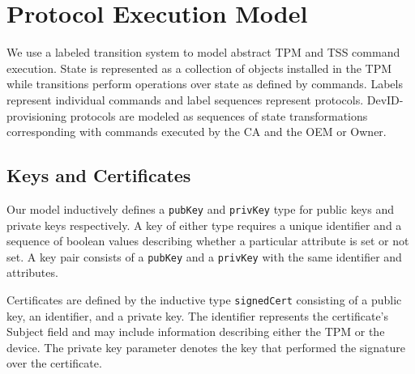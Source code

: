 \documentclass[runningheads]{llncs}
\begin{document}



\section{Protocol Execution Model}

We use a labeled transition system to model abstract TPM and TSS
command execution.  State is represented as a collection of objects
installed in the TPM while transitions perform operations over state
as defined by commands.  Labels represent individual commands and
label sequences represent protocols.  DevID-provisioning protocols are
modeled as sequences of state transformations corresponding with
commands executed by the CA and the OEM or Owner.

\subsection{Keys and Certificates}

Our model inductively defines a \verb|pubKey| and \verb|privKey|
type for public keys and private keys respectively. A key of either
type requires a unique identifier and a sequence of boolean values
describing whether a particular attribute is set or not set. A key
pair consists of a \verb|pubKey| and a \verb|privKey| with the same
identifier and attributes.



Certificates are defined by the inductive type \verb|signedCert|
consisting of a public key, an identifier, and a private key. The
identifier represents the certificate's Subject field and may include
information describing either the TPM or the device. The private key
parameter denotes the key that performed the signature over the
certificate.
\end{document}
